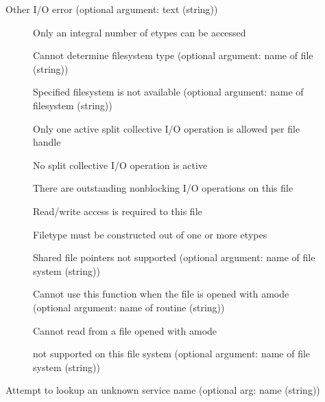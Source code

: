 \begin{description}
\item[]Other I/O error (optional argument: text (string))
    \begin{description}
    \item[]Only an integral number of
      etypes can be accessed
    \item[]Cannot determine filesystem type
      (optional argument: name of file (string))
    \item[]Specified filesystem is
      not available (optional argument: name of filesystem (string))
    \item[]Only one active split
      collective I/O operation is allowed per file handle
    \item[]No split collective I/O
      operation is active
    \item[]There are outstanding
      nonblocking I/O operations on this file
    \item[]Read/write access is required to
      this file
    \item[]Filetype must be constructed out of
      one or more etypes
    \item[]Shared file pointers not
      supported (optional argument: name of file system (string))
    \item[]Cannot use this function when the
      file is opened with amode  (optional
      argument: name of routine (string))
    \item[]Cannot read from a file opened
      with amode 
    \item[]
      not supported on this file system (optional argument: name of file
      system (string))
    \end{description}
\item[]Attempt to lookup an unknown service name
  (optional arg: name (string))

\end{description}
